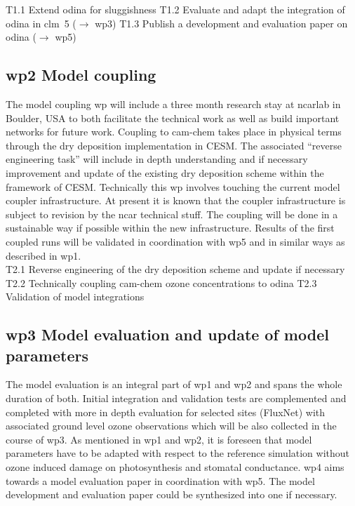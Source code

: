 T1.1 Extend \gls{odina} for sluggishness  
T1.2 Evaluate and adapt the integration of \gls{odina} in \gls{clm}~5 ($\rightarrow$ \gls{wp}3)
T1.3 Publish a development and evaluation paper on \gls{odina} ($\rightarrow$ \gls{wp}5)

\subsection*{\gls{wp}2 Model coupling}
\label{ssec:wp2}
The model coupling \gls{wp} will include a three month research stay at \gls{ncar}lab in Boulder, USA to both facilitate the technical work as well as build important networks for future work. Coupling to \gls{cam}-chem takes place in physical terms through the dry deposition implementation in CESM. The associated “reverse engineering task” will include in depth understanding and if necessary improvement and update of the existing dry deposition scheme within the framework of CESM. Technically this \gls{wp} involves touching the current model coupler infrastructure. At present it is known that the coupler infrastructure is subject to revision by the \gls{ncar} technical stuff. The coupling will be done in a sustainable way if possible within the new infrastructure. Results of the first coupled runs will be validated in coordination with \gls{wp}5 and in similar ways as described in \gls{wp}1.\\

T2.1 Reverse engineering of the dry deposition scheme and update if necessary 
T2.2 Technically coupling \gls{cam}-chem ozone concentrations to \gls{odina}
T2.3 Validation of model integrations

\subsection*{\gls{wp}3 Model evaluation and update of model parameters}
\label{ssec:wp3}
The model evaluation is an integral part of \gls{wp}1 and \gls{wp}2 and spans the whole duration of both. Initial integration and validation tests are complemented and completed with more in depth evaluation for selected sites (FluxNet) with associated ground level ozone observations which will be also collected in the course of \gls{wp}3. As mentioned in \gls{wp}1 and \gls{wp}2, it is foreseen that model parameters have to be adapted with respect to the reference simulation without ozone induced damage on photosynthesis and stomatal conductance. \gls{wp}4 aims towards a model evaluation paper in coordination with \gls{wp}5. The model development and evaluation paper could be synthesized into one if necessary.\\

